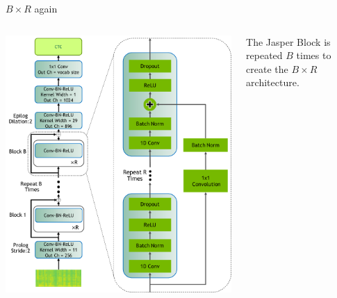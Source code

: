 \documentclass[aspectratio=169,xcolor={dvipsnames,svgnames}]{beamer}
\begin{document}
\begin{frame}[label={sec:org53f4ffa}]{\(B\times R\) again}
\begin{columns}
\begin{column}{0.45\columnwidth}
\begin{center}
\includegraphics[width=.9\linewidth]{org-download-images/Contribution/2024-08-28_07-44-17_screenshot.png}
\end{center}
\end{column}

\begin{column}{0.55\columnwidth}
The Jasper Block is repeated \(B\) times to create the
\(B\times R\) architecture.
\end{column}
\end{columns}
\end{frame}
\end{document}
